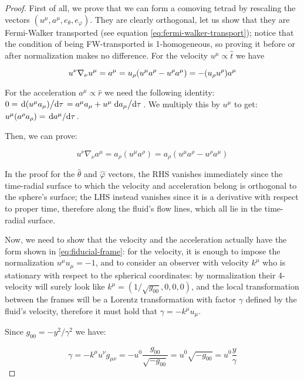 \documentclass[main.tex]{subfiles}
\begin{document}
\begin{proof}
    First of all, we prove that we can form a comoving tetrad by rescaling the vectors \((u^\mu, a^\mu, e_\theta, e_\varphi)\). They are clearly orthogonal, let us show that they are Fermi-Walker transported (see equation \eqref{eq:fermi-walker-transport}); notice that the condition of being FW-transported is 1-homogeneous, so proving it before or after normalization makes no difference.
    For the velocity \(u^\mu \propto \hat{t}\)  we have

    \begin{equation}
        u^\nu \nabla_\nu u^\mu = a^\mu = u_\rho \qty(u^\mu a^\rho - u^\rho a^\mu) = - (u_\rho u^\rho) a^\mu
    \end{equation}

    For the acceleration \(a^\mu \propto \hat{r} \) we need the following identity: \(0=\dv*{(u^\mu a_\mu)}{\tau} =a^\mu a_\mu + u^\mu \dv*{a_\mu}{\tau} \). We multiply this by \(u^\mu\) to get: \(u^\mu (a^\rho a_\rho) = \dv*{a^\mu}{\tau}\).

    Then, we can prove:

    \begin{equation}
      u^\nu \nabla_\nu a^\mu
      = a_\rho (u^\mu a^\rho)
      = a_\rho (u^\mu a^\rho - u^\rho a^\mu)
    \end{equation}

    In the proof for the \(\hat{\theta} \) and \(\hat\varphi\) vectors, the RHS vanishes immediately since the time-radial surface to which the velocity and acceleration belong is orthogonal to the sphere's surface; the LHS instead vanishes since it is a derivative with respect to proper time, therefore along the fluid's flow lines, which all lie in the time-radial surface.

    Now, we need to show that the velocity and the acceleration actually have the form shown in \eqref{eq:fiducial-frame}: for the velocity, it is enough to impose the normalization \(u^\mu u_\mu = -1 \), and to consider an observer with velocity  \(k^\mu\) who is stationary with respect to the spherical coordinates: by normalization their 4-velocity will surely look like \(k^\mu = (1/\sqrt{g_{00}}, 0,0,0)\), and the local transformation between the frames will be a Lorentz transformation with factor \(\gamma\) defined by the fluid's velocity, therefore it must hold that \(\gamma = - k^\mu u_\mu\).

    Since \(g_{00} = - y^2 / \gamma^2\) we have:

    \begin{equation}
      \gamma = - k^\mu u^\nu g_{\mu\nu} = - u^0 \frac{g_{00}}{\sqrt{-g_{00}} }
      = u^0 \sqrt{-g_{00}} = u^0 \frac{y}{\gamma}
    \end{equation}


\end{proof}
\end{document}
